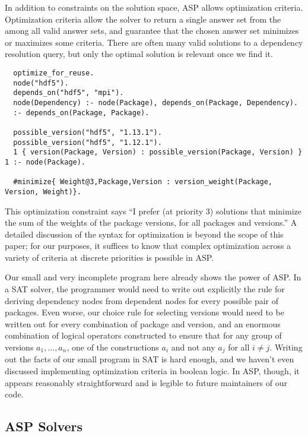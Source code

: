 In addition to constraints on the solution space, ASP allows optimization criteria.
Optimization criteria allow the solver to return a single answer set from the among all valid answer sets, and guarantee that the chosen answer set minimizes or maximizes some criteria.
There are often many valid solutions to a dependency resolution query, but only the optimal solution is relevant once we find it.

\begin{verbatim}
  optimize_for_reuse.
  node("hdf5").
  depends_on("hdf5", "mpi").
  node(Dependency) :- node(Package), depends_on(Package, Dependency).
  :- depends_on(Package, Package).

  possible_version("hdf5", "1.13.1").
  possible_version("hdf5", "1.12.1").
  1 { version(Package, Version) : possible_version(Package, Version) } 1 :- node(Package).

  #minimize{ Weight@3,Package,Version : version_weight(Package, Version, Weight)}.
\end{verbatim}

This optimization constraint says ``I prefer (at priority 3) solutions that minimize the sum of the weights of the package versions, for all packages and versions.''
A detailed discussion of the syntax for optimization is beyond the scope of this paper; for our purposes, it suffices to know that complex optimization across a variety of criteria at discrete priorities is possible in ASP.

Our small and very incomplete program here already shows the power of ASP.
In a SAT solver, the programmer would need to write out explicitly the rule for deriving dependency nodes from dependent nodes for every possible pair of packages.
Even worse, our choice rule for selecting versions would need to be written out for every combination of package and version, and an enormous combination of logical operators constructed to ensure that for any group of versions \texttt{$a_1, ..., a_n$}, one of the constructions \texttt{$a_i$} and not any \texttt{$a_j$} for all $i\neq{j}$.
Writing out the facts of our small program in SAT is hard enough, and we haven't even discussed implementing optimization criteria in boolean logic.
In ASP, though, it appears reasonably straightforward and is legible to future maintainers of our code.

\subsection{ASP Solvers}

